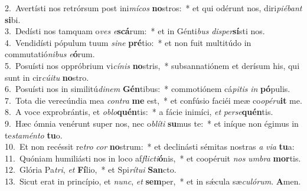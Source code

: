 {2.~}Avertísti nos retrórsum post ini\textit{mí}\textit{cos} \textbf{no}stros:~* et qui odérunt nos, diri\textit{pi}\textit{é}\textit{bant} \textbf{si}bi.\\
{3.~}Dedísti nos tamquam o\textit{ves} \textit{e}\textbf{scá}rum:~* et in Génti\textit{bus} \textit{di}\textit{sper}\textbf{sí}sti nos.\\
{4.~}Vendidísti pópulum tuum \textit{si}\textit{ne} \textbf{pré}tio:~* et non fuit multitúdo in commutatió\textit{ni}\textit{bus} \textit{e}\textbf{ó}rum.\\
{5.~}Posuísti nos oppróbrium vi\textit{cí}\textit{nis} \textbf{no}stris,~* subsannatiónem et derísum his, qui sunt in cir\textit{cú}\textit{i}\textit{tu} \textbf{no}stro.\\
{6.~}Posuísti nos in similitú\textit{di}\textit{nem} \textbf{Gén}tibus:~* commotiónem cá\textit{pi}\textit{tis} \textit{in} \textbf{pó}pulis.\\
{7.~}Tota die verecúndia mea \textit{con}\textit{tra} \textbf{me} est,~* et confúsio faciéi meæ co\textit{o}\textit{pé}\textit{ru}\textbf{it} me.\\
{8.~}A voce exprobrántis, et \textit{o}\textit{blo}\textbf{quén}tis:~* a fácie inimíci, \textit{et} \textit{per}\textit{se}\textbf{quén}tis.\\
{9.~}Hæc ómnia venérunt super nos, nec o\textit{blí}\textit{ti} \textbf{su}mus te:~* et iníque non égimus in te\textit{sta}\textit{mén}\textit{to} \textbf{tu}o.\\
{10.~}Et non recéssit re\textit{tro} \textit{cor} \textbf{no}strum:~* et declinásti sémitas nostras \textit{a} \textit{vi}\textit{a} \textbf{tu}a:\\
{11.~}Quóniam humiliásti nos in loco af\textit{fli}\textit{cti}\textbf{ó}nis,~* et coopéruit \textit{nos} \textit{um}\textit{bra} \textbf{mor}tis.\\
{12.~}Glória Pa\textit{tri}, \textit{et} \textbf{Fí}lio,~* et Spi\textit{rí}\textit{tu}\textit{i} \textbf{San}cto.\\
{13.~}Sicut erat in princípio, et \textit{nunc}, \textit{et} \textbf{sem}per,~* et in sǽcula sæ\textit{cu}\textit{ló}\textit{rum}. \textbf{A}men.\\
